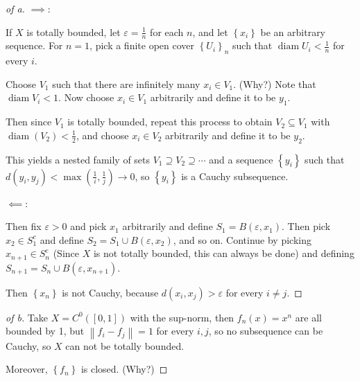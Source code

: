 \begin{solution}

\envlist

\begin{proof}[of a]

\(\implies\):

If \(X\) is totally bounded, let \(\varepsilon = \frac 1 n\) for each
\(n\), and let \(\left\{{x_i}\right\}\) be an arbitrary sequence. For
\(n=1\), pick a finite open cover \(\left\{{U_i}\right\}_n\) such that
\({\operatorname{diam}}{U_i} < \frac 1 n\) for every \(i\).

Choose \(V_1\) such that there are infinitely many \(x_i \in V_1\).
(Why?) Note that \({\operatorname{diam}}V_i < 1\). Now choose
\(x_i \in V_1\) arbitrarily and define it to be \(y_1\).

Then since \(V_1\) is totally bounded, repeat this process to obtain
\(V_2 \subseteq V_1\) with \({\operatorname{diam}}(V_2)< \frac 1 2\),
and choose \(x_i \in V_2\) arbitrarily and define it to be \(y_2\).

This yields a nested family of sets
\(V_1 \supseteq V_2 \supseteq \cdots\) and a sequence
\(\left\{{y_i}\right\}\) such that
\(d(y_i, y_j) < \max(\frac 1 i, \frac 1 j) \to 0\), so
\(\left\{{y_i}\right\}\) is a Cauchy subsequence.

\(\impliedby\):

Then fix \(\varepsilon > 0\) and pick \(x_1\) arbitrarily and define
\(S_1 = B(\varepsilon, x_1)\). Then pick \(x_2 \in S_1^c\) and define
\(S_2 = S_1 \cup B(\varepsilon, x_2)\), and so on. Continue by picking
\(x_{n+1} \in S_n^c\) (Since \(X\) is not totally bounded, this can
always be done) and defining
\(S_{n+1} = S_n \cup B(\varepsilon, x_{n+1})\).

Then \(\left\{{x_n}\right\}\) is not Cauchy, because
\(d(x_i, x_j) > \varepsilon\) for every \(i\neq j\).

\end{proof}

\begin{proof}[of b]

Take \(X = C^0([0, 1])\) with the sup-norm, then \(f_n(x) = x^n\) are
all bounded by 1, but \({\left\lVert {f_i - f_j} \right\rVert} = 1\) for
every \(i, j\), so no subsequence can be Cauchy, so \(X\) can not be
totally bounded.

Moreover, \(\left\{{f_n}\right\}\) is closed. (Why?)

\end{proof}

\end{solution}

